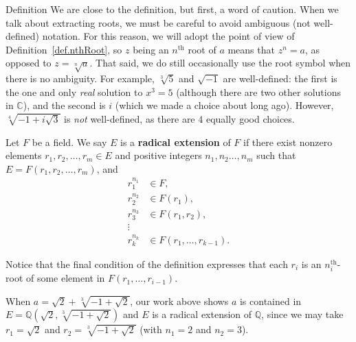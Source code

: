 \begin{section}{Definition}
We are close to the definition, but first, a word of caution. When we talk about extracting roots, we must be careful to avoid ambiguous (not well-defined) notation. For this reason, we will adopt the point of view of Definition~\ref{def.nthRoot}, so $z$ being an $n^\text{th}$ root of $a$ means that $z^n = a$, as opposed to  $z = \sqrt[n]{a}$. That said, we do still occasionally use the root symbol when there is no ambiguity. For example, $\sqrt[3]{5}$ and $\sqrt{-1}$ are well-defined: the first is the one and only \emph{real} solution to $x^3=5$ (although there are two other solutions in $\mathbb{C}$), and the second is $i$ (which we made a choice about long ago). However,  $\sqrt[4]{-1 + i\sqrt{3}}$ is \emph{not} well-defined, as there are $4$ equally good choices.

\begin{definition}
Let $F$ be a field. We say  $E$ is a \textbf{radical extension} of $F$ if there exist nonzero elements $r_1,r_2,\ldots,r_m\in E$ and positive integers $n_1,n_2\ldots,n_m$ such that $E = F(r_1,r_2,\ldots,r_m)$, and 
\begin{align*}
 r_1^{n_1} &\in F,\\
 r_2^{n_2} &\in F(r_1),\\
 r_3^{n_3} &\in F(r_1,r_2),\\
 \vdots & \\
 r_k^{n_k} &\in F(r_1,\ldots,r_{k-1}).
\end{align*}
\end{definition}
Notice that the final condition of the definition expresses that each $r_i$ is an $n_i^\text{th}$-root of some element in $F(r_1,\ldots,r_{i-1})$. 

When $a = \sqrt{2} + \sqrt[3]{-1 + \sqrt{2}}$, our work above shows  $a$ is contained in  $E= \mathbb{Q}\left(\sqrt{2},\sqrt[3]{-1 + \sqrt{2}}\right)$ and $E$ is a radical extension of $\mathbb{Q}$, since we may take $r_1 = \sqrt{2}$ and $r_2 = \sqrt[3]{-1 + \sqrt{2}}$ (with $n_1 = 2$ and $n_2 = 3$).


%


\end{section}








